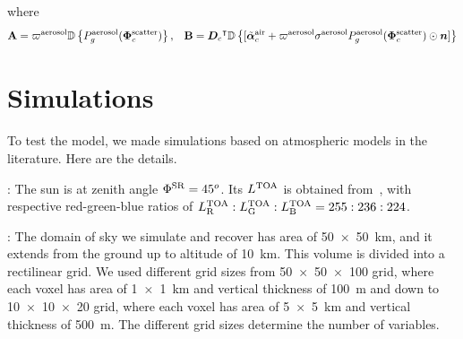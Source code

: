 \documentclass[10pt,letterpaper]{article}
\newcommand{\OpDiag}[1]{\mathbb{D}\left\{#1\right\}}
\newcommand{\abbrev}[1]{\rm{#1}}
\newcommand{\vect}[1]{\bm{#1}}
\newcommand{\transpose}[1]{{#1}^\intercal}
\begin{document}
where
\begin{equation}
  \label{eq:gradient3}
  {\bf A} = \varpi^{\rm aerosol}
       \OpDiag{ P_g^{\rm aerosol}(\vect{\Phi}^{\rm scatter}_c)}
  ,\;\;\;
  {\bf B} = \transpose{{\bm D}_c}
      \OpDiag{[\tilde{\vect{\alpha}}^{\rm air}_c + \varpi^{\rm
      aerosol}\sigma^{\rm aerosol} P^{\rm aerosol}_g(\vect{\Phi}^{\rm
      scatter}_c) \odot{\bm n}    ]}
\end{equation}




\section{Simulations}
\label{sec:simul}

To test the model, we made simulations based on atmospheric models in
the literature. Here are the details.

: The sun is at zenith angle $\Phi^{\rm
  SR}=45^o$. Its $L^{\rm TOA}$ is obtained
from~\cite{BBradiance,sun_composition}, with respective red-green-blue
ratios of $L^{\rm TOA}_{\rm R}:L^{\rm TOA}_{\rm G}:L^{\rm TOA}_{\rm
  B}=255:236:224$.

: The domain of sky we simulate and recover
has area of \SI{50 x 50}{\km}, and it extends from the ground up to
altitude of \SI{10}{\km}. This volume is divided into a rectilinear
grid. We used different grid sizes from \num{50 x 50 x 100} grid,
where each voxel has area of \SI{1 x 1}{\km} and vertical thickness of
\SI{100}{\metre} and down to \num{10 x 10 x 20} grid, where each voxel
has area of \SI{5 x 5}{\km} and vertical thickness of
\SI{500}{\metre}. The different grid sizes determine the number of
variables.
\end{document}
